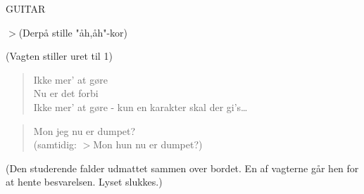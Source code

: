 \documentclass[a4paper,11pt]{article}
\begin{document}
GUITAR

$>$(Derpå stille "åh,åh"-kor)

(Vagten stiller uret til 1)

\begin{verse}
Ikke mer' at gøre\\
Nu er det forbi\\
Ikke mer' at gøre - kun en karakter skal der gi's\dots \\
\end{verse}

\begin{verse}
Mon jeg nu er dumpet?\\
(samtidig: $>$Mon hun nu er dumpet?)\\
\end{verse}

\scene
(Den studerende falder udmattet sammen over bordet. En af
vagterne går hen for at hente besvarelsen. Lyset slukkes.)
\end{document}
